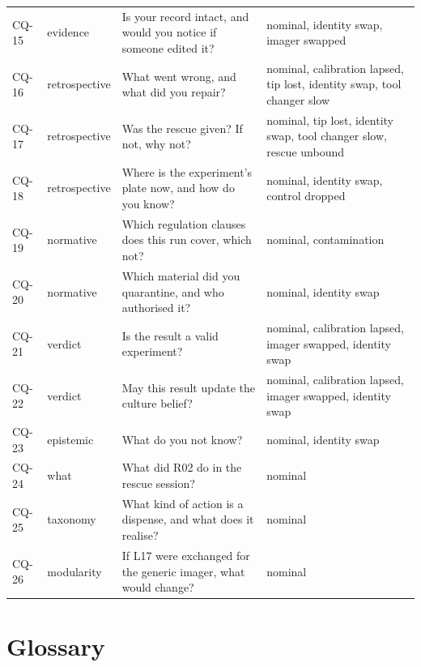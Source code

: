 \documentclass[10pt,a4paper]{article}
\begin{document}
{\begin{xltabular}{\linewidth}{llXp{3.6cm}}
CQ-15 & evidence & Is your record intact, and would you notice if someone edited it? & nominal, identity swap, imager swapped \\
CQ-16 & retrospective & What went wrong, and what did you repair? & nominal, calibration lapsed, tip lost, identity swap, tool changer slow \\
CQ-17 & retrospective & Was the rescue given? If not, why not? & nominal, tip lost, identity swap, tool changer slow, rescue unbound \\
CQ-18 & retrospective & Where is the experiment's plate now, and how do you know? & nominal, identity swap, control dropped \\
CQ-19 & normative & Which regulation clauses does this run cover, which not? & nominal, contamination \\
CQ-20 & normative & Which material did you quarantine, and who authorised it? & nominal, identity swap \\
CQ-21 & verdict & Is the result a valid experiment? & nominal, calibration lapsed, imager swapped, identity swap \\
CQ-22 & verdict & May this result update the culture belief? & nominal, calibration lapsed, imager swapped, identity swap \\
CQ-23 & epistemic & What do you not know? & nominal, identity swap \\
CQ-24 & what & What did R02 do in the rescue session? & nominal \\
CQ-25 & taxonomy & What kind of action is a dispense, and what does it realise? & nominal \\
CQ-26 & modularity & If L17 were exchanged for the generic imager, what would change? & nominal \\
\end{xltabular}}

\section{Glossary}\label{sec:glossary}
\end{document}
